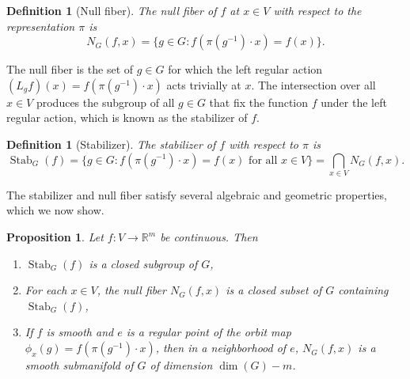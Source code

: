 \documentclass[11pt]{article}
\newtheorem{proposition}[theorem]{Proposition}
\newtheorem{definition}[theorem]{Definition}
\DeclareMathOperator{\Stab}{Stab}
\newcommand{\RR}{\mathbb{R}}
\begin{document}
\begin{definition}[Null fiber]\label{def:null-fiber}
The \emph{null fiber} of $f$ at $x \in V$ with respect to the representation $\pi$ is
\begin{equation}\label{eq:null-fiber}
    N_G(f, x) = \{ g \in G : f(\pi(g^{-1}) \cdot x) = f(x) \}.
\end{equation}
\end{definition}
\noindent The null fiber is the set of $g\in G$ for which the left regular action $(L_gf)(x)=f(\pi(g^{-1})\cdot x)$ acts trivially at $x$. The intersection over all $x\in V$ produces the subgroup of all $g\in G$ that fix the function $f$ under the left regular action, which is known as the stabilizer of $f$.
\begin{definition}[Stabilizer]\label{def:stabilizer}
The \emph{stabilizer} of $f$ with respect to $\pi$ is
\begin{equation}\label{eq:stabilizer}
    \Stab_G(f) = \{ g \in G : f(\pi(g^{-1}) \cdot x) = f(x) \text{ for all } x \in V \} = \bigcap_{x \in V} N_G(f, x).
\end{equation}
\end{definition}
\noindent The stabilizer and null fiber satisfy several algebraic and geometric properties, which we now show.
\begin{proposition}\label{prop:basic-properties}
Let $f\colon V \to \RR^m$ be continuous. Then
\begin{enumerate}
    \item $\Stab_G(f)$ is a closed subgroup of $G$,
    \item For each $x \in V$, the null fiber $N_G(f, x)$ is a closed subset of $G$ containing $\Stab_G(f)$,
    \item If $f$ is smooth and $e$ is a regular point of the orbit map $\phi_x(g)=f(\pi(g^{-1}) \cdot x)$, then in a neighborhood of $e$, $N_G(f, x)$ is a smooth submanifold of $G$ of dimension $\dim(G) - m$.
\end{enumerate}
\end{proposition}
\end{document}
